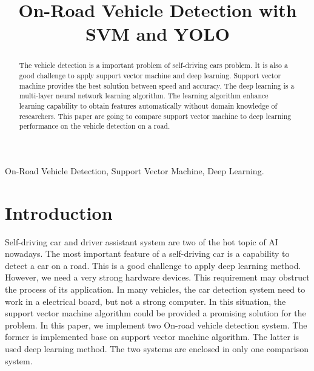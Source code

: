 \documentclass[conference]{IEEEtran}
\begin{document}
%
\title{On-Road Vehicle Detection with SVM and YOLO}


\author{
}





\maketitle


\begin{abstract}
The vehicle detection is a important problem of self-driving cars problem. It is also a good challenge to apply support vector machine and deep learning. Support vector machine provides the best solution between speed and accuracy. The deep learning is a multi-layer neural network learning algorithm. The learning algorithm enhance learning capability to obtain features automatically without domain knowledge of researchers. This paper are going to compare support vector machine to deep learning performance on the vehicle detection on a road.
\end{abstract}

\begin{IEEEkeywords}
On-Road Vehicle Detection, Support Vector Machine, Deep Learning. 
\end{IEEEkeywords}


\section{Introduction}
Self-driving car and driver assistant system are two of the hot topic of AI nowadays. The most important feature of a self-driving car is a capability to detect a car on a road. This is a good challenge to apply deep learning method. However, we need a very strong hardware devices. This requirement may obstruct the process of its application. In many vehicles, the car detection system need to work in a electrical board, but not a strong computer. In this situation, the support vector machine algorithm could be provided a promising solution for the problem. In this paper, we implement two On-road vehicle detection system. The former is implemented base on support vector machine algorithm. The latter is used deep learning method. The two systems are enclosed in only one comparison system.
\end{document}
